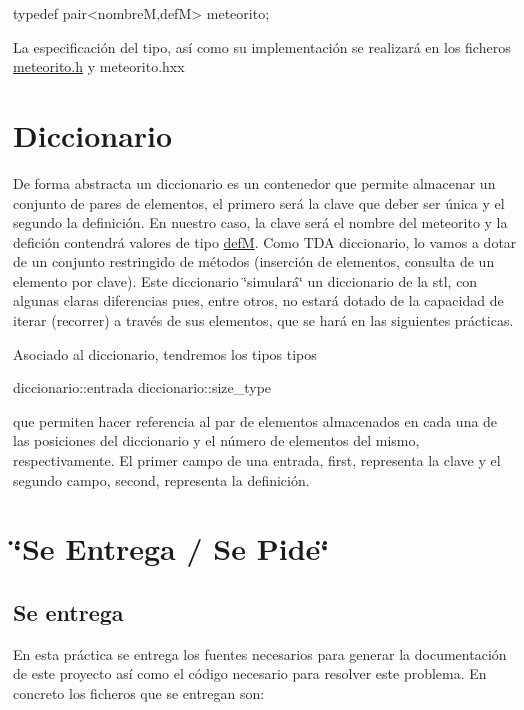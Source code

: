 \begin{DoxyCode}
\textcolor{keyword}{typedef} pair<nombreM,defM> meteorito; 
\end{DoxyCode}


La especificación del tipo, así como su implementación se realizará en los ficheros \hyperlink{meteorito_8h_source}{meteorito.\-h} y meteorito.\-hxx\hypertarget{index_dicc}{}\section{Diccionario}\label{index_dicc}
De forma abstracta un diccionario es un contenedor que permite almacenar un conjunto de pares de elementos, el primero será la clave que deber ser única y el segundo la definición. En nuestro caso, la clave será el nombre del meteorito y la defición contendrá valores de tipo \hyperlink{classdefM}{def\-M}. Como T\-D\-A diccionario, lo vamos a dotar de un conjunto restringido de métodos (inserción de elementos, consulta de un elemento por clave). Este diccionario \char`\"{}simulará\char`\"{} un diccionario de la stl, con algunas claras diferencias pues, entre otros, no estará dotado de la capacidad de iterar (recorrer) a través de sus elementos, que se hará en las siguientes prácticas.

Asociado al diccionario, tendremos los tipos tipos 
\begin{DoxyCode}
diccionario::entrada
diccionario::size\_type
\end{DoxyCode}
 que permiten hacer referencia al par de elementos almacenados en cada una de las posiciones del diccionario y el número de elementos del mismo, respectivamente. El primer campo de una entrada, first, representa la clave y el segundo campo, second, representa la definición.\hypertarget{index_sec_tar}{}\section{\char`\"{}\-Se Entrega / Se Pide\char`\"{}}\label{index_sec_tar}
\hypertarget{index_ssEntrega}{}\subsection{Se entrega}\label{index_ssEntrega}
En esta práctica se entrega los fuentes necesarios para generar la documentación de este proyecto así como el código necesario para resolver este problema. En concreto los ficheros que se entregan son\-:


